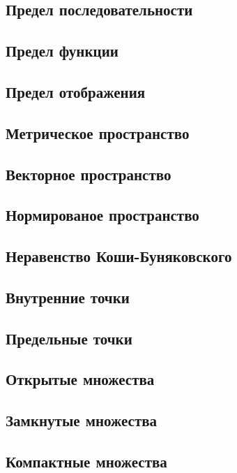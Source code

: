 \subsection{Предел последовательности}

\skip
\subsection{Предел функции}

\skip
\subsection{Предел отображения}

\skip
\subsection{Метрическое пространство}

\skip
\subsection{Векторное пространство}

\skip
\subsection{Нормированое пространство}

\skip
\subsection{Неравенство Коши-Буняковского}

\skip
\subsection{Внутренние точки}

\skip
\subsection{Предельные точки}

\skip
\subsection{Открытые множества}

\skip
\subsection{Замкнутые множества}

\skip
\subsection{Компактные множества}

\skip
